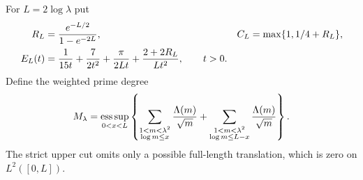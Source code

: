 \documentclass[11pt]{article}
\theoremstyle{remark}
\begin{document}
For $L=2\log\lambda$ put
\begin{align}
 R_L&=\frac{e^{-L/2}}{1-e^{-2L}},&
 C_L&=\max\{1,1/4+R_L\},\notag\\
 E_L(t)&=\frac1{15t}+\frac7{2t^2}
       +\frac\pi{2Lt}+\frac{2+2R_L}{Lt^2},\qquad t>0.
 \label{eq:v115-arch-errors}
\end{align}
Define the weighted prime degree
\begin{equation}\label{eq:v115-prime-degree}
 M_\lambda=\mathop{\rm ess\,sup}_{0<x<L}
 \left\{\sum_{\substack{1<m<\lambda^2\\\log m\le x}}
                    \frac{\Lambda(m)}{\sqrt m}
       +\sum_{\substack{1<m<\lambda^2\\\log m\le L-x}}
                    \frac{\Lambda(m)}{\sqrt m}\right\}.
\end{equation}
The strict upper cut omits only a possible full-length translation,
which is zero on $L^2([0,L])$.
\end{document}

